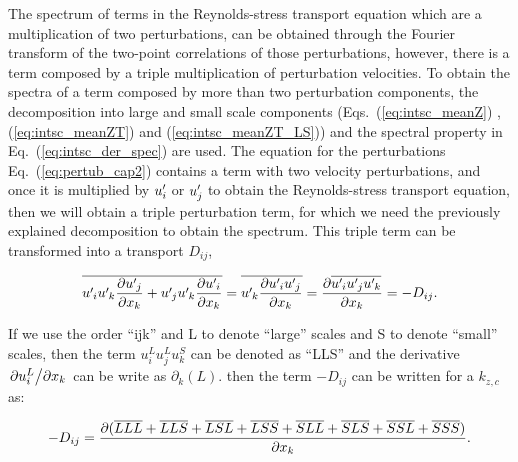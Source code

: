 The spectrum of terms in the Reynolds-stress transport equation which are a multiplication of two perturbations, can be obtained through the Fourier transform of the two-point correlations of those perturbations, however, there is a term composed by a triple multiplication of perturbation velocities.
To obtain the spectra of a term composed by more than two perturbation components, the decomposition into large and small scale components (Eqs.~(\ref{eq:intsc_meanZ}) , (\ref{eq:intsc_meanZT}) and (\ref{eq:intsc_meanZT_LS})) and the spectral property in Eq.~(\ref{eq:intsc_der_spec}) are used.
The equation for the perturbations Eq.~(\ref{eq:pertub_cap2}) contains a term with two velocity perturbations, and once it is multiplied by $u_i^{\prime}\mkern-1.2mu$ or $u_j^{\prime}\mkern-1.2mu$ to obtain the Reynolds-stress transport equation, then we will obtain a triple perturbation term, for which we need the previously explained decomposition to obtain the spectrum. This triple term can be transformed into a transport $D_{ij}$,

\begin{equation}
    \overline{ u^{\prime}\mkern-1.2mu_i u^{\prime}\mkern-1.2mu_k \pdv{u^{\prime}\mkern-1.2mu_j}{x_k} + u^{\prime}\mkern-1.2mu_j u^{\prime}\mkern-1.2mu_k \pdv{u^{\prime}\mkern-1.2mu_i}{x_k} } = 
    \overline{ u^{\prime}\mkern-1.2mu_k \pdv{  u^{\prime}\mkern-1.2mu_i u^{\prime}\mkern-1.2mu_j }{x_k} } = 
    \pdv{ \overline{ u^{\prime}\mkern-1.2mu_i u^{\prime}\mkern-1.2mu_j u^{\prime}\mkern-1.2mu_k } }{x_k}  = 
    - D_{ij}. 
\end{equation}

If we use the order ``ijk'' and L to denote ``large'' scales and S to denote ``small'' scales, then the term $u_i^Lu_j^Lu_k^S$ can be denoted as ``LLS'' and the derivative $\pdv{u_i^L}/{x_k}$ can be write as $\partial_k(L)$.
then the term $-D_{ij}$ can be written for a $k_{z,c}$ as: 

\begin{equation}
    \label{eq:Dij_LLL_decomp}
    - D_{ij} = \pdv{ (\overline{LLL} + \overline{LLS} + \overline{LSL} + \overline{LSS} + \overline{SLL} + \overline{SLS} + \overline{SSL} + \overline{SSS} ) }{x_k}.
\end{equation}

